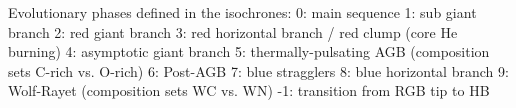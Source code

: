 Evolutionary phases defined in the isochrones:
0: main sequence
1: sub giant branch
2: red giant branch
3: red horizontal branch / red clump (core He burning)
4: asymptotic giant branch
5: thermally-pulsating AGB (composition sets C-rich vs. O-rich)
6: Post-AGB
7: blue stragglers
8: blue horizontal branch
9: Wolf-Rayet (composition sets WC vs. WN)
-1: transition from RGB tip to HB
